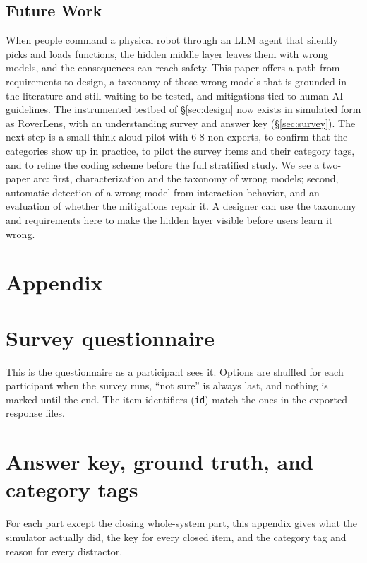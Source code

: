 \documentclass[sigconf]{acmart}
\begin{document}
\subsection{Future Work}
When people command a physical robot through an LLM agent that silently picks and loads functions, the hidden middle layer leaves them with wrong models, and the consequences can reach safety. This paper offers a path from requirements to design, a taxonomy of those wrong models that is grounded in the literature and still waiting to be tested, and mitigations tied to human-AI guidelines. The instrumented testbed of \S\ref{sec:design} now exists in simulated form as RoverLens, with an understanding survey and answer key (\S\ref{sec:survey}). The next step is a small think-aloud pilot with 6-8 non-experts, to confirm that the categories show up in practice, to pilot the survey items and their category tags, and to refine the coding scheme before the full stratified study. We see a two-paper arc: first, characterization and the taxonomy of wrong models; second, automatic detection of a wrong model from interaction behavior, and an evaluation of whether the mitigations repair it. A designer can use the taxonomy and requirements here to make the hidden layer visible before users learn it wrong.




\clearpage
\appendix
\section*{Appendix}
\begingroup\small
\section{Survey questionnaire}\label{app:instrument}
This is the questionnaire as a participant sees it. Options are shuffled for each participant when the survey runs, ``not sure'' is always last, and nothing is marked until the end. The item identifiers (\texttt{id}) match the ones in the exported response files.


\section{Answer key, ground truth, and category tags}\label{app:key}
For each part except the closing whole-system part, this appendix gives what the simulator actually did, the key for every closed item, and the category tag and reason for every distractor.

\endgroup
\end{document}
